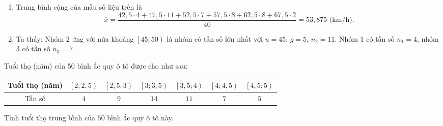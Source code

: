 \begin{bt}
{\begin{enumerate}
\begin{center}
\begin{tabular}{|c|c|c|c|}
					      \hline
					                           &                           & $n = 40$        &                          \\
					      \hline
				      \end{tabular}
			      \end{center}
			\item Trung bình cộng của mẫu số liệu trên là
			      \[
				      \overline{x} = \dfrac{42{,}5 \cdot 4 + 47{,}5 \cdot 11 + 52{,}5 \cdot 7+ 57{,}5 \cdot 8+ 62{,}5 \cdot 8 + 67{,}5 \cdot 2}{40} = 53{,}875\text{ (km/h)}.
			      \]
			\item Ta thấy: Nhóm $2$ ứng với nửa khoảng $\left[45;50\right)$ là nhóm có tần số lớn nhất với $u=45$, $g=5$, $n_2 = 11$. Nhóm $1$ có tần số $n_1 = 4$, nhóm $3$ có tần số $n_3 = 7$.
		\end{enumerate}
	}
\end{bt}
\begin{bt}%
	Tuổi thọ (năm) của 50 bình ắc quy ô tô được cho như sau:
	\begin{center}
		\begin{tabular}{|c|c|c|c|c|c|c|}
			\hline
			Tuổi thọ (năm) & $\left[2;2{,}5 \right)$ & $\left[2{,}5;3 \right)$ & $\left[3;3{,}5 \right)$ & $\left[3{,}5;4 \right)$ & $\left[4;4{,}5 \right)$ & $\left[4{,}5;5 \right)$ \\
			\hline
			Tần số         & $4$                     & $9$                     & $14$                    & $11$                    & $7$                     & $5$                     \\
			\hline
		\end{tabular}
	\end{center}
	Tính tuổi thọ trung bình của $50$ bình ắc quy ô tô này.
\end{bt}
